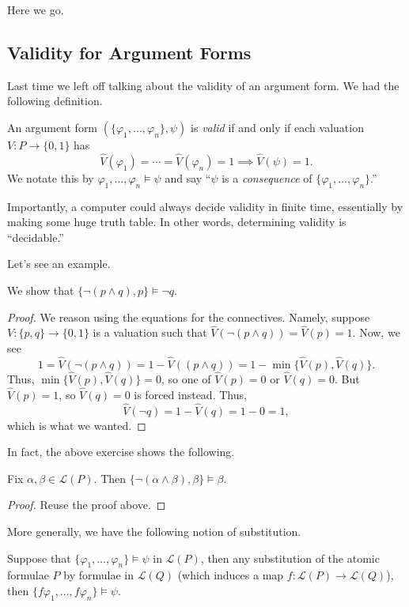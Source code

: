 
Here we go.

\subsection{Validity for Argument Forms}
Last time we left off talking about the validity of an argument form. We had the following definition.
\begin{definition}[Valid]
	An argument form $(\{\varphi_1,\ldots,\varphi_n\},\psi)$ is \textit{valid} if and only if each valuation $V:P\to\{0,1\}$ has
	\[\hat V(\varphi_1)=\cdots=\hat V(\varphi_n)=1\implies\hat V(\psi)=1.\]
	We notate this by $\varphi_1,\ldots,\varphi_n\models\psi$ and say ``$\psi$ is a \textit{consequence} of $\{\varphi_1,\ldots,\varphi_n\}$.''
\end{definition}
\begin{remark}
	Importantly, a computer could always decide validity in finite time, essentially by making some huge truth table. In other words, determining validity is ``decidable.''
\end{remark}
Let's see an example.
\begin{exe}
	We show that $\{\lnot(p\land q),p\}\models\lnot q$.
\end{exe}
\begin{proof}
	We reason using the equations for the connectives. Namely, suppose $V:\{p,q\}\to\{0,1\}$ is a valuation such that $\hat V(\lnot(p\land q))=\hat V(p)=1$. Now, we see
	\[1=\hat V(\lnot(p\land q))=1-\hat V((p\land q))=1-\min\{\hat V(p),\hat V(q)\}.\]
	Thus, $\min\{\hat V(p),\hat V(q)\}=0$, so one of $\hat V(p)=0$ or $\hat V(q)=0$. But $\hat V(p)=1$, so $\hat V(q)=0$ is forced instead. Thus,
	\[\hat V(\lnot q)=1-\hat V(q)=1-0=1,\]
	which is what we wanted.
\end{proof}
In fact, the above exercise shows the following.
\begin{proposition} \label{prop:easysub}
	Fix $\alpha,\beta\in\mathcal L(P)$. Then $\{\lnot(\alpha\land\beta),\beta\}\models\beta$.
\end{proposition}
\begin{proof}
	Reuse the proof above.
\end{proof}
More generally, we have the following notion of substitution.
\begin{proposition}[Substitution]
	Suppose that $\{\varphi_1,\ldots,\varphi_n\}\models\psi$ in $\mathcal L(P)$, then any substitution of the atomic formulae $P$ by formulae in $\mathcal L(Q)$ (which induces a map $f:\mathcal L(P)\to\mathcal L(Q)$), then $\{f\varphi_1,\ldots,f\varphi_n\}\models\psi$.
\end{proposition}
